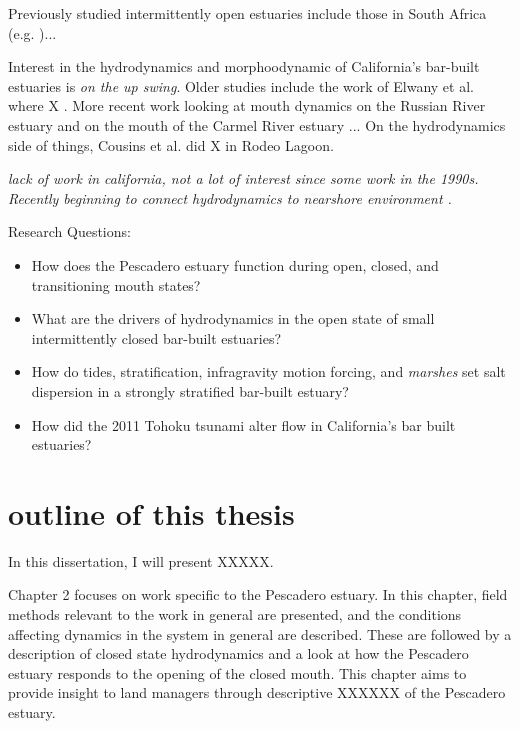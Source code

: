 Previously studied intermittently open estuaries include those in South Africa (e.g. \cite{largier_dynamics_1991})...


Interest in the hydrodynamics and morphoodynamic of California's bar-built estuaries is \emph{on the up swing}. Older studies include the work of Elwany et al. where X \cite{elwany_opening_1998}. More recent work looking at mouth dynamics on the Russian River estuary \parencite{behrens_characterization_2009, behrens_episodic_2013} and on the mouth of the Carmel River estuary \parencite{rich_hydrologic_2013}... On the hydrodynamics side of things, Cousins et al. \cite{cousins_hydrodynamics_2011} did X in Rodeo Lagoon. 


\emph{lack of work in california, not a lot of interest since some work in the 1990s.  Recently beginning to connect hydrodynamics to nearshore environment \parencite{dodet_wave-current_2013, uncles_infragravity_2014}.}



Research Questions:
\begin{itemize}
	\item{How does the Pescadero estuary function during open, closed, and transitioning mouth states?}
	\item{What are the drivers of hydrodynamics in the open state of small intermittently closed bar-built estuaries?}
	\item{How do tides, stratification, infragravity motion forcing, and \emph{marshes} set salt dispersion in a strongly stratified bar-built estuary?}
	\item{How did the 2011 Tohoku tsunami alter flow in California's bar built estuaries?}
\end{itemize}




\section{outline of this thesis}

In this dissertation, I will present XXXXX.

Chapter 2 focuses on work specific to the Pescadero estuary. In this chapter, field methods relevant to the work in general are presented, and the conditions affecting dynamics in the system in general are described. These are followed by a description of closed state hydrodynamics and a look at how the Pescadero estuary responds to the opening of the closed mouth. This chapter aims to provide insight to land managers through descriptive XXXXXX of the Pescadero estuary.

